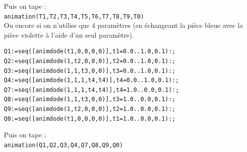\documentclass[a4paper,11pt]{book}
\begin{document}
Puis on tape :\\
{\tt animation(T1,T2,T3,T4,T5,T6,T7,T8,T9,T0)}\\
Ou encore si on n'utilise que 4  param\`etres (en \'echangeant la pi\`ece bleue 
avec la pi\`ece violette \`a l'aide d'un seul param\`etre).\\
\begin{verbatim}
Q1:=seq([animdode(t1,0,0,0,0)],t1=0.0..1.0,0.1):;
Q2:=seq([animdode(1,t2,0,0,0)],t2=0.0..1.0,0.1):;
Q3:=seq([animdode(1,1,t3,0,0)],t3=0.0..1.0,0.1):;
Q4:=seq([animdode(1,1,1,t4,t4)],t4=0.0..1.0,0.1):;
Q7:=seq([animdode(1,1,1,t4,t4)],t4=1.0..0.0,0.1):;
Q8:=seq([animdode(1,1,t3,0,0)],t3=1.0..0.0,0.1):;
Q9:=seq([animdode(1,t2,0,0,0)],t2=1.0..0.0,0.1):;
Q0:=seq([animdode(t1,0,0,0,0)],t1=1.0..0.0,0.1):;
\end{verbatim}
Puis on tape :\\
{\tt animation(Q1,Q2,Q3,Q4,Q7,Q8,Q9,Q0)}
\end{document}
